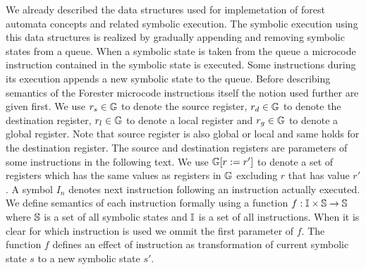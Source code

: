 We already described the data structures used for implemetation of forest automata concepts
and related symbolic execution.
The symbolic execution using this data structures is realized by gradually appending
and removing symbolic states from a queue.
When a symbolic state is taken from the queue a microcode instruction contained in
the symbolic state is executed.
Some instructions during its execution appends a new symbolic state to the queue.
Before describing semantics of the Forester microcode instructions itself
the notion used further are given first.
We use $r_s \in \mathbb{G}$ to denote the source register,
$r_d \in \mathbb{G}$ to denote the destination register,
$r_l \in \mathbb{G}$ to denote a local register and
$r_g \in \mathbb{G}$ to denote a global register.
Note that source register is also global or local and same holds for the destination register.
The source and destination registers are parameters of some instructions in the following text.
We use $\mathbb{G} [r := r']$ to denote a set of registers which has the same values as registers in $\mathbb{G}$
excluding $r$ that has value $r'$.
A symbol $I_n$ denotes next instruction following an instruction actually executed.
We define semantics of each instruction formally using a function 
$f: \mathbb{I} \times \mathbb{S} \rightarrow \mathbb{S}$
where $\mathbb{S}$ is a set of all symbolic states and $\mathbb{I}$ is a set of all instructions.
When it is clear for which instruction is used we ommit the first parameter of $f$.
The function $f$ defines an effect of instruction as transformation of current
symbolic state $s$ to a new symbolic state $s'$.

